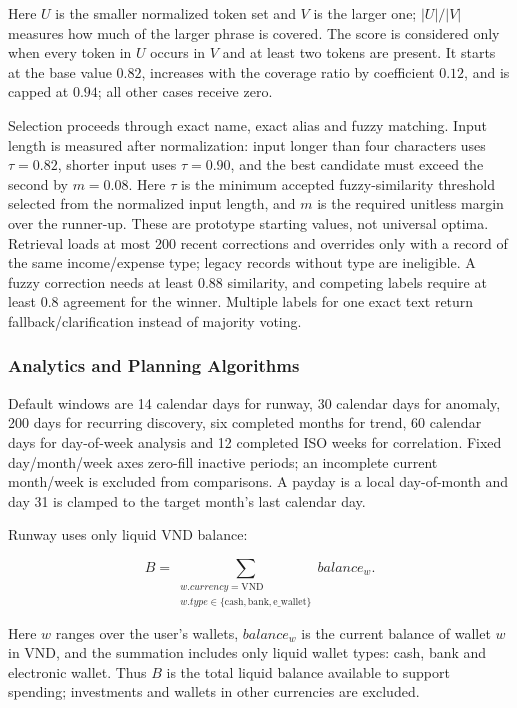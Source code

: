 Here $U$ is the smaller normalized token set and $V$ is the larger one; $|U|/|V|$ measures how much of the larger phrase is covered. The score is considered only when every token in $U$ occurs in $V$ and at least two tokens are present. It starts at the base value $0.82$, increases with the coverage ratio by coefficient $0.12$, and is capped at $0.94$; all other cases receive zero.

Selection proceeds through exact name, exact alias and fuzzy matching. Input length is measured after normalization: input longer than four characters uses $\tau=0.82$, shorter input uses $\tau=0.90$, and the best candidate must exceed the second by $m=0.08$. Here $\tau$ is the minimum accepted fuzzy-similarity threshold selected from the normalized input length, and $m$ is the required unitless margin over the runner-up. These are prototype starting values, not universal optima. Retrieval loads at most 200 recent corrections and overrides only with a record of the same income/expense type; legacy records without type are ineligible. A fuzzy correction needs at least 0.88 similarity, and competing labels require at least 0.8 agreement for the winner. Multiple labels for one exact text return fallback/clarification instead of majority voting.

\subsubsection{Analytics and Planning Algorithms}
\label{subsec:analytics-design}

Default windows are 14 calendar days for runway, 30 calendar days for anomaly, 200 days for recurring discovery, six completed months for trend, 60 calendar days for day-of-week analysis and 12 completed ISO weeks for correlation. Fixed day/month/week axes zero-fill inactive periods; an incomplete current month/week is excluded from comparisons. A payday is a local day-of-month and day 31 is clamped to the target month's last calendar day.

Runway uses only liquid VND balance:

\begin{equation}
  B=\sum_{\substack{w.currency=\mathrm{VND}\\
  w.type\in\{\mathrm{cash},\mathrm{bank},\mathrm{e\_wallet}\}}} balance_w.
\end{equation}

Here $w$ ranges over the user's wallets, $balance_w$ is the current balance of wallet $w$ in VND, and the summation includes only liquid wallet types: cash, bank and electronic wallet. Thus $B$ is the total liquid balance available to support spending; investments and wallets in other currencies are excluded.

